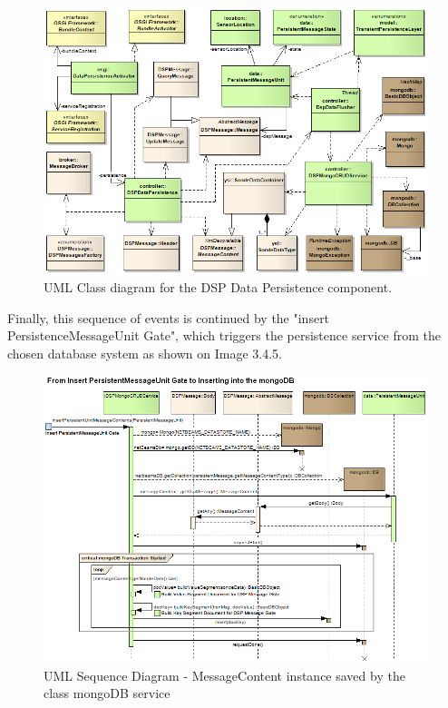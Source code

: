\begin{figure}[!b]
  \centering
  \includegraphics[scale=0.5]{../diagrams/DSP-Data-Persistence-Classes}
  \caption{UML Class diagram for the DSP Data Persistence component.}
  \label{fig:DSP-Data-Persistence-Classes}
\end{figure}

Finally, this sequence of events is continued by the "insert
PersistenceMessageUnit Gate", which triggers the persistence service from the
chosen database system as shown on Image 3.4.5.

\begin{figure}[!b]
  \centering
  \includegraphics[scale=0.5]{../diagrams/From-Insert-PersistentMessageUnit-to-mongoDB}
  \caption{UML Sequence Diagram - MessageContent instance saved by the class
  mongoDB service}
  \label{fig:From-Insert-PersistentMessageUnit-to-mongoDB}
\end{figure}

